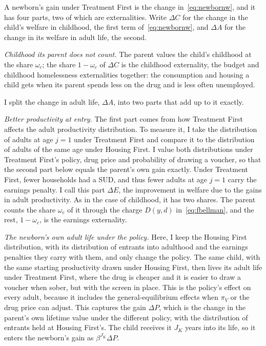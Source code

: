 \documentclass[10pt]{article}
\begin{document}
A newborn's gain under Treatment First is the change in~\eqref{eq:newbornw}, and it has four parts, two of which are externalities. Write $\Delta C$ for the change in the child's welfare in childhood, the first term of~\eqref{eq:newbornw}, and $\Delta A$ for the change in its welfare in adult life, the second.

\emph{Childhood its parent does not count.} The parent values the child's childhood at the share $\omega_c$; the share $1-\omega_c$ of $\Delta C$ is the childhood externality, the budget and childhood homelessness externalities together: the consumption and housing a child gets when its parent spends less on the drug and is less often unemployed.

I split the change in adult life, $\Delta A$, into two parts that add up to it exactly.

\emph{Better productivity at entry.}   The first part comes from how Treatment First affects the adult productivity distribution. To measure it, I take the distribution of adults at age $j=1$ under Treatment First and compare it to the distribution of adults of the same age under Housing First. I value both distributions under Treatment First's policy, drug price and probability of drawing a voucher, so that the second part below equals the parent's own gain exactly. Under Treatment First, fewer households had a SUD, and thus fewer adults at age $j=1$ carry the earnings penalty. I call this part $\Delta E$, the improvement in welfare due to the gains in adult productivity.  As in the case of childhood, it has two shares. The parent counts the share $\omega_c$ of it through the charge $D(y,d)$ in~\eqref{eq:fbellman}, and the rest, $1-\omega_c$, is the earnings externality.

\emph{The newborn's own adult life under the policy.}   Here, I keep the Housing First distribution, with its distribution of entrants into adulthood and the earnings penalties they carry with them, and only change the policy. The same child, with the same starting productivity drawn under Housing First, then lives its adult life under Treatment First, where the drug is cheaper and it is easier to draw a voucher when sober, but with the screen in place. This is the policy's effect on every adult, because it includes the general-equilibrium effects when $\pi_V$ or the drug price can adjust. This captures the gain $\Delta P$, which is the change in the parent's own lifetime value under the different policy, with the distribution of entrants held at Housing First's. The child receives it $J_K$ years into its life, so it enters the newborn's gain as $\beta^{J_K}\Delta P$. 
\end{document}
